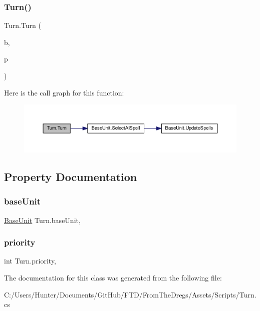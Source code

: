 \subsubsection{\texorpdfstring{Turn()}{Turn()}}
{\footnotesize\ttfamily Turn.\+Turn (\begin{DoxyParamCaption}\item[{\mbox{\hyperlink{class_base_unit}{Base\+Unit}}}]{b,  }\item[{int}]{p }\end{DoxyParamCaption})}

Here is the call graph for this function\+:
\nopagebreak
\begin{figure}[H]
\begin{center}
\leavevmode
\includegraphics[width=350pt]{class_turn_a6446f2b617305c390dce97e1c7242066_cgraph}
\end{center}
\end{figure}


\subsection{Property Documentation}
\mbox{\label{class_turn_a59d549b1393677617e4237dcab3e27f9}} 
\subsubsection{\texorpdfstring{baseUnit}{baseUnit}}
{\footnotesize\ttfamily \mbox{\hyperlink{class_base_unit}{Base\+Unit}} Turn.\+base\+Unit\hspace{0.3cm}{\ttfamily [get]}, {\ttfamily [set]}}

\mbox{\label{class_turn_aad40e669aa7299a23aa01c1756edd975}} 
\subsubsection{\texorpdfstring{priority}{priority}}
{\footnotesize\ttfamily int Turn.\+priority\hspace{0.3cm}{\ttfamily [get]}, {\ttfamily [set]}}



The documentation for this class was generated from the following file\+:\begin{DoxyCompactItemize}
\item 
C\+:/\+Users/\+Hunter/\+Documents/\+Git\+Hub/\+F\+T\+D/\+From\+The\+Dregs/\+Assets/\+Scripts/Turn.\+cs\end{DoxyCompactItemize}
